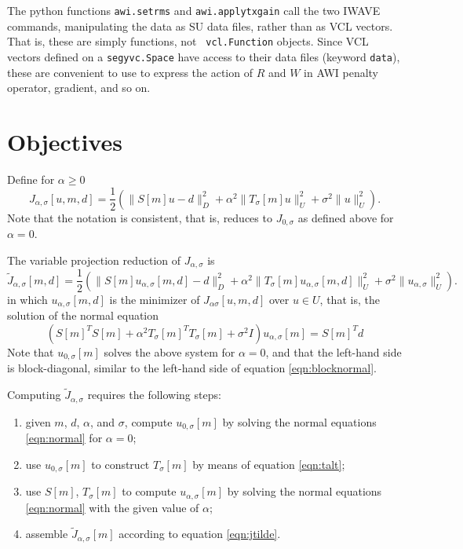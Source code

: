 The python functions {\tt awi.setrms} and {\tt awi.applytxgain} call
the two IWAVE commands, manipulating the data as SU data files, rather
than as VCL vectors. That is, these are simply functions, not {\tt
  vcl.Function} objects. Since VCL vectors defined on a {\tt segyvc.Space}
have access to their data files (keyword {\tt data}), these are
convenient to use to express the action of $R$ and $W$ in AWI penalty operator,
gradient, and so on.

\section{Objectives}
Define for $\alpha \ge 0$
\[
 J_{\alpha,\sigma}[u,m,d] = \frac{1}{2}(\|S[m]u - d\|_D^2 + \alpha^2\|T_\sigma[m]u\|_U^2 + \sigma^2 \|u\|^2_U).
\]
Note that the notation is consistent, that is, reduces to $J_{0,\sigma}$ as defined above for $\alpha=0$.

The variable projection reduction of $J_{\alpha,\sigma}$ is
\begin{equation}
  \label{eqn:jtilde}
 \tilde{J}_{\alpha,\sigma}[m,d] = \frac{1}{2}(\|S[m]u_{\alpha,\sigma}[m,d] - d\|_D^2 + \alpha^2\|T_{\sigma}[m]u_{\alpha,\sigma}[m,d]\|_U^2 + \sigma^2 \|u_{\alpha,\sigma}\|^2_U).
\end{equation}
in which $u_{\alpha,\sigma}[m,d]$ is the minimizer of $J_{\alpha\sigma}[u,m,d]$ over $u \in U$, that is, the solution of the normal equation
\begin{equation}
  \label{eqn:normal}
  (S[m]^TS[m] + \alpha^2T_{\sigma}[m]^TT_{\sigma}[m] + \sigma^2I)u_{\alpha,\sigma}[m] = S[m]^Td
\end{equation}
Note that $u_{0,\sigma}[m]$ solves the above system for $\alpha=0$, and that the left-hand side is block-diagonal, similar to the left-hand side of equation \ref{eqn:blocknormal}.

Computing $\tilde{J}_{\alpha,\sigma}$ requires the following steps:
\begin{enumerate}
\item given $m$, $d$, $\alpha$, and $\sigma$, compute $u_{0,\sigma}[m]$ by solving the normal equations \ref{eqn:normal} for $\alpha=0$;
\item use $u_{0,\sigma}[m]$ to construct $T_{\sigma}[m]$ by means of
  equation \ref{eqn:talt};
\item use $S[m]$, $T_{\sigma}[m]$ to compute $u_{\alpha,\sigma}[m]$ by solving the normal equations \ref{eqn:normal} with the given value of $\alpha$;
\item assemble $\tilde{J}_{\alpha,\sigma}[m]$ according to equation \ref{eqn:jtilde}.
\end{enumerate}

